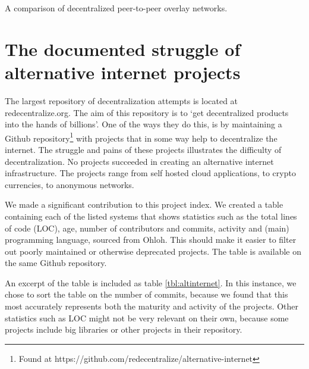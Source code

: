 \documentclass{article}
\begin{document}
		\begin{table}[t]
			\centering
			
			\caption{A comparison of decentralized peer-to-peer overlay networks.}
			\label{tbl:comparison}
		\end{table}

\section{The documented struggle of alternative internet projects}
	\label{sec:comparison}	
	
	The largest repository of decentralization attempts is located at redecentralize.org. The aim of this repository is to \textquoteleft get decentralized products into the hands of billions\textquoteright \cite{aboutredecentralizeorg}. One of the ways they do this, is by maintaining a Github repository\footnote{Found at https://github.com/redecentralize/alternative-internet} with projects that in some way help to decentralize the internet. The struggle and pains of these projects illustrates the difficulty of decentralization. No projects succeeded in creating an alternative internet infrastructure. The projects range from self hosted cloud applications, to crypto currencies, to anonymous networks.


		
	We made a significant contribution to this project index. We created a table containing each of the listed systems that shows statistics such as the total lines of code (LOC), age, number of contributors and commits, activity and (main) programming language, sourced from Ohloh. This should make it easier to filter out poorly maintained or otherwise deprecated projects. The table is available on the same Github repository.
		
	An excerpt of the table is included as table \ref{tbl:altinternet}. In this instance, we chose to sort the table on the number of commits, because we found that this most accurately represents both the maturity and activity of the projects. Other statistics such as LOC might not be very relevant on their own, because some projects include big libraries or other projects in their repository.
		
\end{document}

